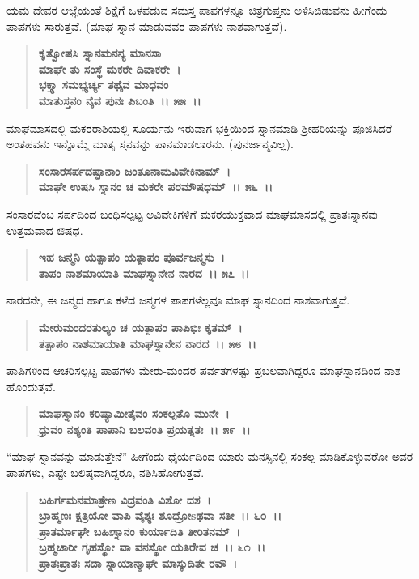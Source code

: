 ಯಮ ದೇವರ ಆಜ್ಞೆಯಂತೆ ಶಿಕ್ಷೆಗೆ ಒಳಪಡುವ ಸಮಸ್ತ ಪಾಪಗಳನ್ನೂ ಚಿತ್ರಗುಪ್ತನು ಅಳಿಸಿಬಿಡುವನು ಹೀಗೆಂದು ಪಾಪಗಳು ಸಾರುತ್ತವೆ. (ಮಾಘ ಸ್ನಾನ ಮಾಡುವವರ ಪಾಪಗಳು ನಾಶವಾಗುತ್ತವೆ).

\begin{verse}
\textbf{ಕೃತ್ವೋಷಸಿ ಸ್ನಾನಮನನ್ಯ ಮಾನಸಾ}\\\textbf{ಮಾಘೇ ತು ಸಂಸ್ಥೆ ಮಕರೇ ದಿವಾಕರೇ~।}\\\textbf{ಭಕ್ತ್ಯಾ ಸಮಭ್ಯರ್ಚ್ಯ ತಥೈವ ಮಾಧವಂ} \\\textbf{ಮಾತುಸ್ತನಂ ನೈವ ಪುನಃ ಪಿಬಂತಿ~।। ೫೫~।।}
\end{verse}

ಮಾಘಮಾಸದಲ್ಲಿ ಮಕರರಾಶಿಯಲ್ಲಿ ಸೂರ್ಯನು ಇರುವಾಗ ಭಕ್ತಿಯಿಂದ ಸ್ನಾನಮಾಡಿ ಶ‍್ರೀಹರಿಯನ್ನು ಪೂಜಿಸಿದರೆ ಅಂತಹವನು ಇನ್ನೊಮ್ಮೆ ಮಾತೃ ಸ್ತನವನ್ನು ಪಾನಮಾಡಲಾರನು. (ಪುನರ್ಜನ್ಮವಿಲ್ಲ).

\begin{verse}
\textbf{ಸಂಸಾರಸರ್ಪದಷ್ಟಾನಾಂ ಜಂತೂನಾಮವಿವೇಕಿನಾಮ್~।}\\\textbf{ಮಾಘೇ ಉಷಸಿ ಸ್ನಾನಂ ಚ ಮಕರೇ ಪರಮೌಷಧಮ್~।। ೫೬~।।}
\end{verse}

ಸಂಸಾರವೆಂಬ ಸರ್ಪದಿಂದ ಬಂಧಿಸಲ್ಪಟ್ಟ ಅವಿವೇಕಿಗಳಿಗೆ ಮಕರಯುಕ್ತವಾದ ಮಾಘಮಾಸದಲ್ಲಿ ಪ್ರಾತಃಸ್ನಾನವು ಉತ್ತಮವಾದ ಔಷಧ.

\begin{verse}
\textbf{ಇಹ ಜನ್ಮನಿ ಯತ್ಪಾಪಂ ಯತ್ಪಾಪಂ ಪೂರ್ವಜನ್ಮಸು~।}\\\textbf{ತಾಪಂ ನಾಶಮಾಯಾತಿ ಮಾಘಸ್ನಾನೇನ ನಾರದ~।। ೫೭~।।}
\end{verse}

ನಾರದನೇ, ಈ ಜನ್ಮದ ಹಾಗೂ ಕಳೆದ ಜನ್ಮಗಳ ಪಾಪಗಳೆಲ್ಲವೂ ಮಾಘ ಸ್ನಾನದಿಂದ ನಾಶವಾಗುತ್ತವೆ.

\begin{verse}
\textbf{ಮೇರುಮಂದರತುಲ್ಯಂ ಚ ಯತ್ಪಾಪಂ ಪಾಪಿಭಿಃ ಕೃತಮ್~।}\\\textbf{ತತ್ಪಾಪಂ ನಾಶಮಾಯಾತಿ ಮಾಘಸ್ನಾನೇನ ನಾರದ~।। ೫೮~।।}
\end{verse}

ಪಾಪಿಗಳಿಂದ ಆಚರಿಸಲ್ಪಟ್ಟ ಪಾಪಗಳು ಮೇರು-ಮಂದರ ಪರ್ವತಗಳಷ್ಟು ಪ್ರಬಲವಾಗಿದ್ದರೂ ಮಾಘಸ್ನಾನದಿಂದ ನಾಶ ಹೊಂದುತ್ತವೆ.

\begin{verse}
\textbf{ಮಾಘಸ್ನಾನಂ ಕರಿಷ್ಯಾಮೀತೈವಂ ಸಂಕಲ್ಪತೊ ಮುನೇ~।}\\\textbf{ಧ್ರುವಂ ನಶ್ಯಂತಿ ಪಾಪಾನಿ ಬಲವಂತಿ ಪ್ರಯತ್ನತಃ~।। ೫೯~।।}
\end{verse}

“ಮಾಘ ಸ್ನಾನವನ್ನು ಮಾಡುತ್ತೇನೆ” ಹೀಗೆಂದು ಧೈರ್ಯದಿಂದ ಯಾರು ಮನಸ್ಸಿನಲ್ಲಿ ಸಂಕಲ್ಪ ಮಾಡಿಕೊಳ್ಳುವರೋ ಅವರ ಪಾಪಗಳು, ಎಷ್ಟೇ ಬಲಿಷ್ಠವಾಗಿದ್ದರೂ, ನಶಿಸಿಹೋಗುತ್ತವೆ.

\begin{verse}
\textbf{ಬಹಿರ್ಗಮನಮಾತ್ರೇಣ ವಿದ್ರವಂತಿ ವಿಶೋ ದಶ~।}\\\textbf{ಬ್ರಾಹ್ಮಣಃ ಕ್ಷತ್ರಿಯೋ ವಾಪಿ ವೈಶ್ಯಃ ಶೂದ್ರೋsಥವಾ ಸತೀ~।। ೬೦~।। }\\\textbf{ಪ್ರಾತರ್ಮಾಘೇ ಬಹಿಃಸ್ನಾನಂ ಕುರ್ಯಾದಿತಿ ತೀರಿತನಮ್~।}\\\textbf{ಬ್ರಹ್ಮಚಾರೀ ಗೃಹಸ್ಥೋ ವಾ ವನಸ್ಥೋ ಯತಿರೇವ ಚ~।। ೬೧~।।} \\\textbf{ಪ್ರಾತಃಪ್ರಾತಃ ಸದಾ ಸ್ನಾಯಾನ್ಮಾಘೇ ಮಾಸ್ಕುದಿತೇ ರವೌ~।}
\end{verse}

